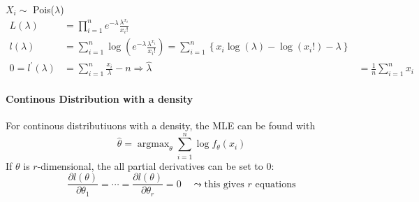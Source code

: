 \begin{examplesection}
    $X_i \sim$ Pois($\lambda$)
    \noindent\begin{align*}
        L(\lambda)            & =\prod_{i=1}^n e^{-\lambda}\frac{\lambda^{x_i}}{x_i!}                                                                                                          \\
        l(\lambda)            & =\sum_{i=1}^n\log\left(e^{-\lambda}\frac{\lambda^{x_i}}{x_i!}\right)=\sum_{i=1}^n\left\{x_i\log(\lambda)-\log(x_i!)-\lambda\right\}                            \\
        0=l^{\prime}(\lambda) & =\sum_{i=1}^n\frac{x_i}\lambda-n     \Rightarrow \hat{\lambda}                                                                      & =\frac1n\sum_{i=1}^n x_i
    \end{align*}
\end{examplesection}

\paragraph{Continous Distribution with a density}
For continous distributiuons with a density, the MLE can be found with
\noindent\begin{equation*}
    \hat{\theta}=\operatorname{argmax}_\theta\sum_{i=1}^n\log f_\theta(x_i)
\end{equation*}
If $\theta$ is $r$-dimensional, the all partial derivatives can be set to 0:
\noindent\begin{equation*}
    \frac{\partial l(\theta)}{\partial\theta_1}=\cdots=\frac{\partial l(\theta)}{\partial\theta_r}=0\quad\leadsto\text{this gives }r\text{ equations}
\end{equation*}

